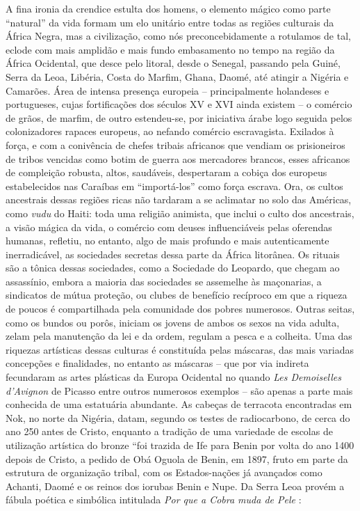 \documentclass[
  letterpaper,
  DIV=11,
  numbers=noendperiod]{scrreprt}
\begin{document}
A fina ironia da crendice estulta dos homens, o elemento mágico como
parte ``natural'' da vida formam um elo unitário entre todas as regiões
culturais da África Negra, mas a civilização, como nós preconcebidamente
a rotulamos de tal, eclode com mais amplidão e mais fundo embasamento no
tempo na região da África Ocidental, que desce pelo litoral, desde o
Senegal, passando pela Guiné, Serra da Leoa, Libéria, Costa do Marfim,
Ghana, Daomé, até atingir a Nigéria e Camarões. Área de intensa presença
europeia -- principalmente holandeses e portugueses, cujas fortificações
dos séculos XV e XVI ainda existem -- o comércio de grãos, de marfim, de
outro estendeu-se, por iniciativa árabe logo seguida pelos colonizadores
rapaces europeus, ao nefando comércio escravagista. Exilados à força, e
com a conivência de chefes tribais africanos que vendiam os prisioneiros
de tribos vencidas como botim de guerra aos mercadores brancos, esses
africanos de compleição robusta, altos, saudáveis, despertaram a cobiça
dos europeus estabelecidos nas Caraíbas em ``importá-los'' como força
escrava. Ora, os cultos ancestrais dessas regiões ricas não tardaram a
se aclimatar no solo das Américas, como \emph{vudu} do Haiti: toda uma
religião animista, que inclui o culto dos ancestrais, a visão mágica da
vida, o comércio com deuses influenciáveis pelas oferendas humanas,
refletiu, no entanto, algo de mais profundo e mais autenticamente
inerradicável, as sociedades secretas dessa parte da África litorânea.
Os rituais são a tônica dessas sociedades, como a Sociedade do Leopardo,
que chegam ao assassínio, embora a maioria das sociedades se assemelhe
às maçonarias, a sindicatos de mútua proteção, ou clubes de benefício
recíproco em que a riqueza de poucos é compartilhada pela comunidade dos
pobres numerosos. Outras seitas, como os bundos ou porôs, iniciam os
jovens de ambos os sexos na vida adulta, zelam pela manutenção da lei e
da ordem, regulam a pesca e a colheita. Uma das riquezas artísticas
dessas culturas é constituída pelas máscaras, das mais variadas
concepções e finalidades, no entanto as máscaras -- que por via indireta
fecundaram as artes plásticas da Europa Ocidental no quando \emph{Les
Demoiselles d'Avignon} de Picasso entre outros numerosos exemplos -- são
apenas a parte mais conhecida de uma estatuária abundante. As cabeças de
terracota encontradas em Nok, no norte da Nigéria, datam, segundo os
testes de radiocarbono, de cerca do ano 250 antes de Cristo, enquanto a
tradição de uma variedade de escolas de utilização artística do bronze
``foi trazida de Ife para Benin por volta do ano 1400 depois de Cristo,
a pedido de Obá Oguola de Benin, em 1897, fruto em parte da estrutura de
organização tribal, com os Estados-nações já avançados como Achanti,
Daomé e os reinos dos iorubas Benin e Nupe. Da Serra Leoa provém a
fábula poética e simbólica intitulada \emph{Por que a Cobra muda de
Pele} :
\end{document}
